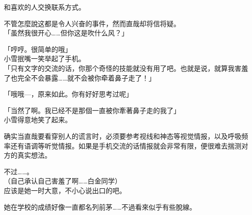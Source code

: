 和喜欢的人交换联系方式。

不管怎麼說这都是令人兴奋的事件，然而直哉却将信将疑。\\

「虽然我很开心……但你这是吹什么风？」

「哼哼。很简单的哦」\\

小雪抿嘴一笑举起了手机。\\

「只有文字的交流的话，你那个奇怪的技能就没有用了吧。也就是说，就算我害羞了也完全不会暴露……就不会被你牵着鼻子走了！」

「哦哦—，原来如此。你有好好思考过呢」

「当然了啊。我已经不是那個一直被你牽著鼻子走的我了」\\

小雪得意地笑了起来。

确实当直哉要看穿别人的谎言时，必须要参考视线和神态等视觉情报，以及呼吸频率还有语调等听觉情报。如果是手机交流的话情报就会非常有限，便很难去揣测对方的真实想法。

不过……。\\

（自己承认自己害羞了啊……白金同学）\\

应该是她一时大意，不小心说出口的吧。

她在学校的成绩好像一直都名列前茅……不過看來似乎有些脫線。\\

